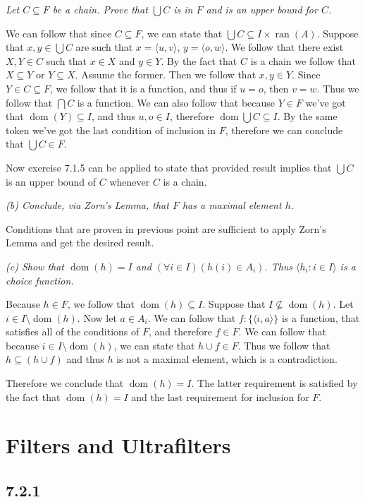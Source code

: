\documentclass[11pt,oneside,titlepage]{book}
\DeclareMathOperator \dom {dom}
\DeclareMathOperator \ran {ran}
\newcommand{\eangle}[1]{\langle #1 \rangle}
\newcommand{\set}[1]{\{ #1 \}}
\begin{document}
\textit{Let $C \subseteq F$ be a chain. Prove that $\bigcup{C}$ is in $F$ and is an upper
  bound for $C$.}

We can follow that since $C \subseteq F$, we can state that $\bigcup{C}
\subseteq I \times \ran(A)$. 
Suppose that $x, y \in \bigcup{C}$ are such that $x = \eangle{u, v}$, $y = \eangle{o, w}$.
We follow that there exist $X, Y \in C$ such that
$x \in X$ and $y \in Y$. By the fact that $C$ is a chain we follow that $X \subseteq Y$
or $Y \subseteq X$. Assume the former. Then we follow that $x, y \in Y$. Since
$Y \in C \subseteq F$,
we follow that it is a function, and thus if $u = o$, then $v = w$. Thus we follow
that $\bigcap{C}$ is a function. We can also follow that because $Y \in F$ we've got that
$\dom(Y) \subseteq I$, and thus $u, o \in I$, therefore $\dom{\bigcup{C}} \subseteq I$.
By the same token we've got the last condition of inclusion in $F$, therefore
we can conclude that $\bigcup{C} \in F$.

Now exercise 7.1.5 can be applied to state that provided result implies that $\bigcup{C}$ is
an upper bound of $C$ whenever $C$ is a chain.

\textit{(b) Conclude, via Zorn's Lemma, that $F$ has a maximal element $h$.}

Conditions that are proven in previous point are sufficient to apply Zorn's Lemma and get the
desired result.

\textit{(c) Show that $\dom(h) = I$ and $(\forall i \in I)(h(i) \in A_i)$. Thus
  $\eangle{h_i: i \in I}$ is a choice function.}

Because $h \in F$, we follow that $\dom(h) \subseteq I$. Suppose that $I \not \subseteq \dom(h)$.
Let  $i \in I \setminus \dom(h)$.
Now let $a \in A_i$. We can follow that $f: \set{\eangle{i, a}}$ is a function, that satisfies
all of the conditions of $F$, and therefore $f \in F$. We can follow  that because
$i \in I \setminus \dom(h)$, we can state that $h \cup f \in F$. Thus we follow that
$h \subseteq (h \cup f)$ and thus $h$ is not a maximal element, which is a contradiction.

Therefore we conclude that $\dom(h) = I$. The latter requirement is satisfied by the fact that
$\dom(h) = I$ and the last requirement for inclusion for $F$.

\section{Filters and Ultrafilters}

\subsection*{7.2.1}
\end{document}
